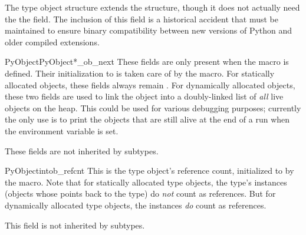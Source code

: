 

The type object structure extends the  structure,
though it does not actually need the the  field.  The
inclusion of this field is a historical accident that must be
maintained to ensure binary compatibility between new versions of
Python and older compiled extensions.

\begin{cmemberdesc}{PyObject}{PyObject*}{_ob_next}
  These fields are only present when the macro  is
  defined.  Their initialization to \NULL{} is taken care of by the
   macro.  For statically allocated objects,
  these fields always remain \NULL.  For dynamically allocated
  objects, these two fields are used to link the object into a
  doubly-linked list of \emph{all} live objects on the heap.  This
  could be used for various debugging purposes; currently the only use
  is to print the objects that are still alive at the end of a run
  when the environment variable  is set.

  These fields are not inherited by subtypes.
\end{cmemberdesc}

\begin{cmemberdesc}{PyObject}{int}{ob_refcnt}
  This is the type object's reference count, initialized to 
  by the  macro.  Note that for statically
  allocated type objects, the type's instances (objects whose
   points back to the type) do \emph{not} count as
  references.  But for dynamically allocated type objects, the
  instances \emph{do} count as references.

  This field is not inherited by subtypes.
\end{cmemberdesc}

